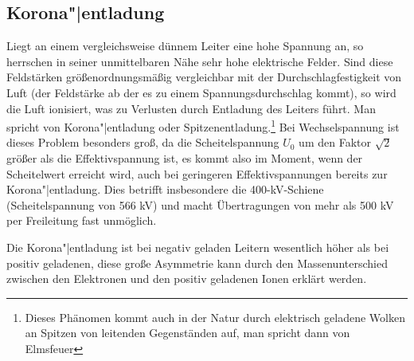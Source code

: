 \subsection{Korona"|entladung}
Liegt an einem vergleichsweise dünnem Leiter eine hohe Spannung an, so herrschen in seiner unmittelbaren Nähe sehr hohe elektrische Felder.
Sind diese Feldstärken größenordnungsmäßig vergleichbar mit der Durchschlagfestigkeit von Luft (der Feldstärke ab der es zu einem Spannungsdurchschlag kommt), so wird die Luft ionisiert, was zu Verlusten durch Entladung des Leiters führt.\cite{BergmannSchaefer}
Man spricht von Korona"|entladung oder Spitzenentladung.\footnote{Dieses Phänomen kommt auch in der Natur durch elektrisch geladene Wolken an Spitzen von leitenden Gegenständen auf, man spricht dann von Elmsfeuer\cite{BergmannSchaefer}}
Bei Wechselspannung ist dieses Problem besonders groß, da die Scheitelspannung $U_0$ um den Faktor $\sqrt{2}$ größer als die Effektivspannung ist, es kommt also im Moment, wenn der Scheitelwert erreicht wird, auch bei geringeren Effektivspannungen bereits zur Korona"|entladung.
Dies betrifft insbesondere die 400-kV-Schiene (Scheitelspannung von 566 kV) und macht Übertragungen von mehr als 500 kV per Freileitung fast unmöglich.%

Die Korona"|entladung ist bei negativ geladen Leitern wesentlich höher als bei positiv geladenen\cite{Padiyar}, diese große Asymmetrie kann durch den Massenunterschied zwischen den Elektronen und den positiv geladenen Ionen erklärt werden. %